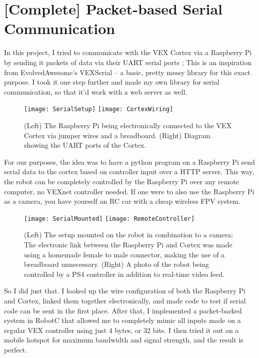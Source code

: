 ﻿\section{[Complete] Packet-based Serial Communication}
In this project, I tried to communicate with the VEX Cortex via a Raspberry Pi by sending it packets of data via their UART serial ports \cite{UARTBasic}; This is an inspiration from EvolvedAwesome's VEXSerial \cite{VEXSerial} -- a basic, pretty messy library for this exact purpose. I took it one step further and made my own library for serial communication, so that it'd work with a web server as well.

\begin{figure}[h]
    \centering
    \texttt{[image: SerialSetup]}
    \texttt{[image: CortexWiring]}
    \caption{
        (Left) The Raspberry Pi being electronically connected to the VEX Cortex via jumper wires and a breadboard. (Right) Diagram showing the UART ports of the Cortex. \cite{CortexWiringCite}
    }
\end{figure}

For our purposes, the idea was to have a python program on a Raspberry Pi send serial data to the cortex based on controller input over a HTTP server. This way, the robot can be completely controlled by the Raspberry Pi over any remote computer, no VEXnet controller needed. If one were to also use the Raspberry Pi as a camera, you have yourself an RC car with a cheap wireless FPV system.

\begin{figure}[h]
    \centering

    \texttt{[image: SerialMounted]}
    \texttt{[image: RemoteController]}
    \caption {
        (Left) The setup mounted on the robot in combination to a camera; The electronic link between the Raspberry Pi and Cortex was made using a homemade female to male connector, making the use of a breadboard unnecessary. (Right) A photo of the robot being controlled by a PS4 controller in addition to real-time video feed.
    }
\end{figure}

So I did just that. I looked up the wire configuration of both the Raspberry Pi and Cortex, linked them together electronically, and made code to test if serial code can be sent in the first place. After that, I implemented a packet-backed system in RobotC that allowed me to completely mimic all inputs made on a regular VEX controller using just 4 bytes, or 32 bits. I then tried it out on a mobile hotspot for maximum bandwidth and signal strength, and the result is perfect.

